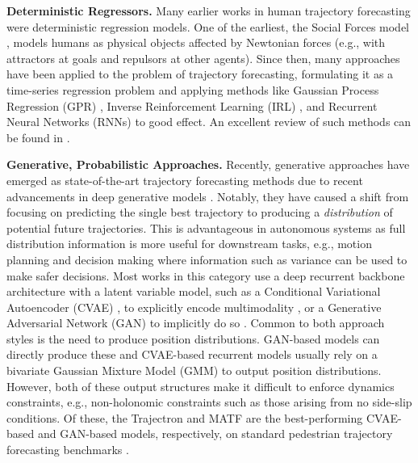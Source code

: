 \documentclass[runningheads]{llncs}
\begin{document}
{\bf Deterministic Regressors.} Many earlier works in human trajectory forecasting were deterministic regression models. One of the earliest, the Social Forces model \cite{HelbingMolnar1995}, models humans as physical objects affected by Newtonian forces (e.g., with attractors at goals and repulsors at other agents). Since then, many approaches have been applied to the problem of trajectory forecasting, formulating it as a time-series regression problem and applying methods like Gaussian Process Regression (GPR) \cite{RasmussenWilliams2006,WangFleetEtAl2008}, Inverse Reinforcement Learning (IRL) \cite{LeeKitani2016}, and Recurrent Neural Networks (RNNs) \cite{AlahiGoelEtAl2016,MortonWheelerEtAl2017,VemulaMuellingEtAl2018} to good effect. An excellent review of such methods can be found in \cite{RudenkoPalmieriEtAl2019}.


{\bf Generative, Probabilistic Approaches.} Recently, generative approaches have emerged as state-of-the-art trajectory forecasting methods due to recent advancements in deep generative models \cite{SohnLeeEtAl2015,GoodfellowPouget-AbadieEtAl2014}. Notably, they have caused a shift from focusing on predicting the single best trajectory to producing a \textit{distribution} of potential future trajectories. This is advantageous in autonomous systems as full distribution information is more useful for downstream tasks, e.g., motion planning and decision making where information such as variance can be used to make safer decisions. Most works in this category use a deep recurrent backbone architecture with a latent variable model, such as a Conditional Variational Autoencoder (CVAE) \cite{SohnLeeEtAl2015}, to explicitly encode multimodality \cite{LeeChoiEtAl2017,IvanovicSchmerlingEtAl2018,DeoTrivedi2018,SadeghianLegrosEtAl2018,IvanovicPavone2019,RhinehartMcAllisterEtAl2019}, or a Generative Adversarial Network (GAN) \cite{GoodfellowPouget-AbadieEtAl2014} to implicitly do so \cite{GuptaJohnsonEtAl2018,SadeghianKosarajuEtAl2019,KosarajuSadeghianEtAl2019,ZhaoXuEtAl2019}. Common to both approach styles is the need to produce position distributions. GAN-based models can directly produce these and CVAE-based recurrent models usually rely on a bivariate Gaussian Mixture Model (GMM) to output position distributions. However, both of these output structures make it difficult to enforce dynamics constraints, e.g., non-holonomic constraints such as those arising from no side-slip conditions.
Of these, the Trajectron \cite{IvanovicPavone2019} and MATF \cite{ZhaoXuEtAl2019} are the best-performing CVAE-based and GAN-based models, respectively, on standard pedestrian trajectory forecasting benchmarks \cite{PellegriniEssEtAl2009,LernerChrysanthouEtAl2007}. 
\end{document}
